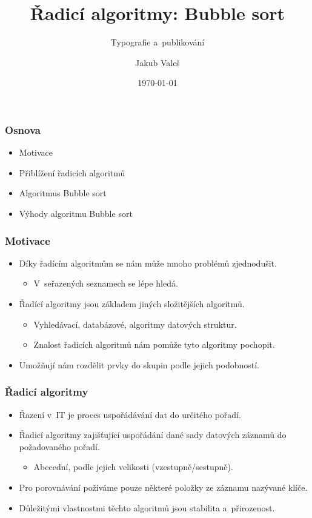 \documentclass{beamer}
\title[] %
{Řadicí algoritmy: Bubble sort}
\subtitle{Typografie a~publikování}
\author[] %
{Jakub Valeš}
\institute[] %
{
    \href{mailto:xvales04@vutbr.cz}{xvales04@vutbr.cz}\\
}
\date[] %
{\today}
\begin{document}
\frame{\titlepage}

\begin{frame}\frametitle{Osnova}
    \begin{itemize}
        \item Motivace
        \item Přiblížení řadicích algoritmů
        \item Algoritmus Bubble sort
        \item Výhody algoritmu Bubble sort
    \end{itemize}
\end{frame}


\begin{frame}\frametitle{Motivace}
    \begin{itemize}
        \item Díky řadícím algoritmům se nám může mnoho problémů zjednodušit.
        \begin{itemize}
            \item V~seřazených seznamech se lépe hledá.
        \end{itemize}
        \item Řadící algoritmy jsou základem jiných složitějších algoritmů.
            \begin{itemize}
                \item Vyhledávací, databázové, algoritmy datových struktur.
                \item Znalost řadicích algoritmů nám pomůže tyto algoritmy pochopit.
        \end{itemize}
        \item Umožňují nám rozdělit prvky do skupin podle jejich podobností.
    \end{itemize}
\end{frame}

\begin{frame}\frametitle{Řadicí algoritmy}
    \begin{itemize}
        \item Řazení v~IT je proces uspořádávání dat do určitého pořadí.
        \item Řadicí algoritmy zajišťující \alert{uspořádání} dané sady datových záznamů \alert{do požadovaného pořadí}.
        \begin{itemize}
            \item Abecední, podle jejich velikosti (vzestupně/sestupně). 
        \end{itemize}
        \item Pro porovnávání požíváme pouze některé položky ze záznamu nazývané \alert{klíče}.
        \item Důležitými vlastnostmi těchto algoritmů jsou \alert{stabilita} a~\alert{přirozenost}.
        
    \end{itemize}
\end{frame}
\end{document}

